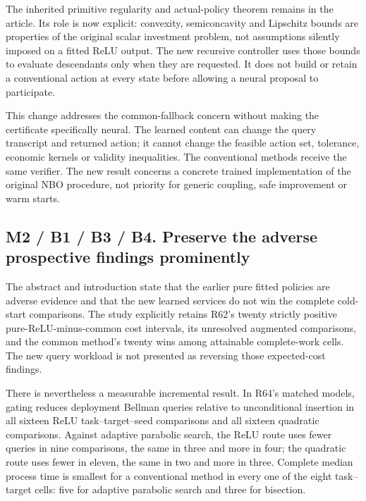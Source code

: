 The inherited primitive regularity and actual-policy theorem remains in
the article. Its role is now explicit: convexity, semiconcavity and
Lipschitz bounds are properties of the original scalar investment
problem, not assumptions silently imposed on a fitted ReLU output. The
new recursive controller uses those bounds to evaluate descendants only
when they are requested. It does not build or retain a conventional
action at every state before allowing a neural proposal to participate.

This change addresses the common-fallback concern without making the
certificate specifically neural. The learned content can change the
query transcript and returned action; it cannot change the feasible
action set, tolerance, economic kernels or validity inequalities. The
conventional methods receive the same verifier. The new result concerns
a concrete trained implementation of the original NBO procedure, not
priority for generic coupling, safe improvement or warm starts.

\hypertarget{m2-b1-b3-b4.-preserve-the-adverse-prospective-findings-prominently}{%
\subsection{M2 / B1 / B3 / B4. Preserve the adverse prospective findings
prominently}\label{m2-b1-b3-b4.-preserve-the-adverse-prospective-findings-prominently}}

The abstract and introduction state that the earlier pure fitted
policies are adverse evidence and that the new learned services do not
win the complete cold-start comparisons. The study explicitly retains
R62's twenty strictly positive pure-ReLU-minus-common cost intervals,
its unresolved augmented comparisons, and the common method's twenty
wins among attainable complete-work cells. The new query workload is not
presented as reversing those expected-cost findings.

There is nevertheless a measurable incremental result. In R64's matched
models, gating reduces deployment Bellman queries relative to
unconditional insertion in all sixteen ReLU task--target--seed
comparisons and all sixteen quadratic comparisons. Against adaptive
parabolic search, the ReLU route uses fewer queries in nine comparisons,
the same in three and more in four; the quadratic route uses fewer in
eleven, the same in two and more in three. Complete median process time
is smallest for a conventional method in every one of the eight
task--target cells: five for adaptive parabolic search and three for
bisection.

